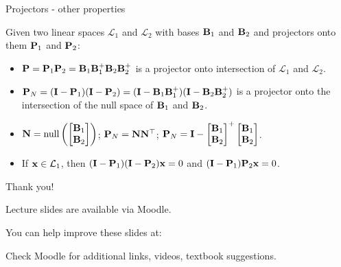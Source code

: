 \documentclass{beamer}
\begin{document}
\begin{frame}{Projectors - other properties}
	\begin{flushleft}
		
		Given two linear spaces $\mathcal L_1$ and $\mathcal L_2$ with bases $\mathbf{B}_1$ and $\mathbf{B}_2$ and projectors onto them $\mathbf{P}_1$ and $\mathbf{P}_2$:
		
		\bigskip
		
		\begin{itemize}
			\item  $\mathbf{P} = \mathbf{P}_1 \mathbf{P}_2 = \mathbf{B}_1 \mathbf{B}_1^+   \mathbf{B}_2 \mathbf{B}_2^+$ is a projector onto intersection of $\mathcal L_1$ and $\mathcal L_2$.
			
			\item  $\mathbf{P}_N = (\mathbf{I} - \mathbf{P}_1)(\mathbf{I} - \mathbf{P}_2) = (\mathbf{I} - \mathbf{B}_1 \mathbf{B}_1^+)(\mathbf{I} - \mathbf{B}_2 \mathbf{B}_2^+)$ is a projector onto the intersection of the null space of $\mathbf{B}_1$ and $\mathbf{B}_2$.
			
			\item $\mathbf{N} = \text{null}\left( \begin{bmatrix}
				\mathbf{B}_1 \\ \mathbf{B}_2
			\end{bmatrix} \right)$; 
		$\mathbf{P}_N = \mathbf{N} \mathbf{N}^\top$; 
		$\mathbf{P}_N = 
		\mathbf{I} - 
		\begin{bmatrix}
			\mathbf{B}_1 \\ \mathbf{B}_2
		\end{bmatrix}^+
	\begin{bmatrix}
		\mathbf{B}_1 \\ \mathbf{B}_2
	\end{bmatrix}$.
			
			\item If $\mathbf{x} \in \mathcal L_1$, then $(\mathbf{I} - \mathbf{P}_1)(\mathbf{I} - \mathbf{P}_2)\mathbf{x} = 0$ and $(\mathbf{I} - \mathbf{P}_1)\mathbf{P}_2\mathbf{x} = 0$.
		\end{itemize}
		
	\end{flushleft}
\end{frame}


\begin{frame}{Thank you!}
\centerline{Lecture slides are available via Moodle.}
\bigskip
\centerline{You can help improve these slides at:}
\centerline{\mygit}
\bigskip
\centerline{Check Moodle for additional links, videos, textbook suggestions.}
\bigskip

\centerline{\textcolor{black}{}}

\end{frame}
\end{document}
